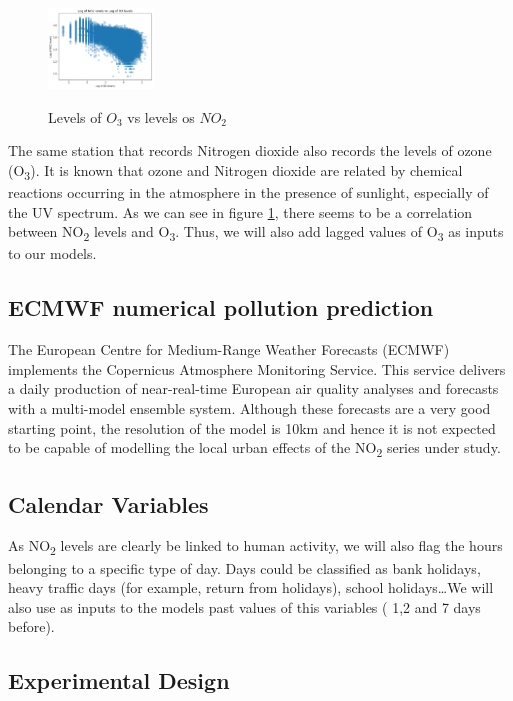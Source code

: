 \documentclass[a4paper,twocolumn,5p]{elsarticle}
\begin{document}
\begin{figure}
  \centering
  \includegraphics[width=0.25\textwidth]{no2vso3}
  \label{figure:no2vso3}
  \caption{Levels of $O_3$ vs levels os $NO_2$}
\end{figure}

The same station that records Nitrogen dioxide also records the levels
of ozone (O\textsubscript{3}). It is known that ozone and Nitrogen
dioxide are related by chemical reactions occurring in the atmosphere
in the presence of sunlight, especially of the UV spectrum.  As we can
see in figure \ref{figure:no2vso3}, there seems to be a correlation
between NO\textsubscript{2} levels and O\textsubscript{3}. Thus, we
will also add lagged values of O\textsubscript{3} as inputs to our
models.

\subsection{ECMWF numerical pollution prediction}
\label{sec:ecmwf-numer-poll}

The European Centre for Medium-Range Weather Forecasts (ECMWF)
implements the Copernicus Atmosphere Monitoring Service.  This service
delivers a daily production of near-real-time European air quality
analyses and forecasts with a multi-model ensemble system. Although
these forecasts are a very good starting point, 
the resolution of the model is 10km
and hence it is not expected to be capable of modelling the local
urban effects of the NO\textsubscript{2} series under study.

\subsection{Calendar Variables}
\label{sec:cal_data}

As NO\textsubscript{2} levels are clearly be linked to human activity,
we will also flag the hours belonging to a specific type of day. Days
could be classified as bank holidays, heavy traffic days (for example,
return from holidays), school holidays\ldots We will also use as
inputs to the models past values of this variables ( 1,2 and 7 days
before).

\subsection{Experimental Design}
\label{sec:experimental-design}
\end{document}
